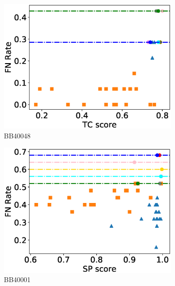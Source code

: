 \begin{figure}[!htbp]
\begin{adjustwidth}{-1cm}{-1cm}
\begin{subfigure}{0.22\textwidth}
			\includegraphics[width=\columnwidth]{Figure/summary/precomputedInit/Balibase/BB40048_fnrate_vs_tc_2}
			\caption{BB40048}
		\end{subfigure}
		\begin{subfigure}{0.22\textwidth}
			\includegraphics[width=\columnwidth]{Figure/summary/precomputedInit/Balibase/BB40001_fnrate_vs_sp_2}
			\caption{BB40001}
		\end{subfigure}	
		\begin{subfigure}{0.22\textwidth}

\end{subfigure}
\end{adjustwidth}
\end{figure}
